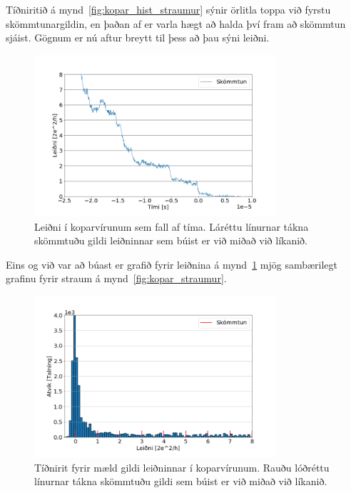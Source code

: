 \documentclass[11pt]{article}
\begin{document}
Tíðniritið á mynd~\ref{fig:kopar_hist_straumur} sýnir örlitla toppa við fyrstu skömmtunargildin, en þaðan af er varla hægt að halda því fram að skömmtun sjáist. Gögnum er nú aftur breytt til þess að þau sýni leiðni.

\begin{figure}[H]
    \centering
    \includegraphics[width=0.8\textwidth]{kopar-leidni.png}
    \caption{Leiðni í koparvírunum sem fall af tíma. Láréttu línurnar tákna skömmtuðu gildi leiðninnar sem búist er við miðað við líkanið.}
    \label{fig:kopar_leidni}
\end{figure}

Eins og við var að búast er grafið fyrir leiðnina á mynd~\ref{fig:kopar_leidni} mjög sambærilegt grafinu fyrir straum á mynd~\ref{fig:kopar_straumur}.

\begin{figure}[H]
    \centering
    \includegraphics[width=0.8\textwidth]{kopar-hist-leidni.png}
    \caption{Tíðnirit fyrir mæld gildi leiðninnar í koparvírunum. Rauðu lóðréttu línurnar tákna skömmtuðu gildi sem búist er við miðað við líkanið.} 
    \label{fig:kopar_hist_leidni}
\end{figure}
\end{document}
